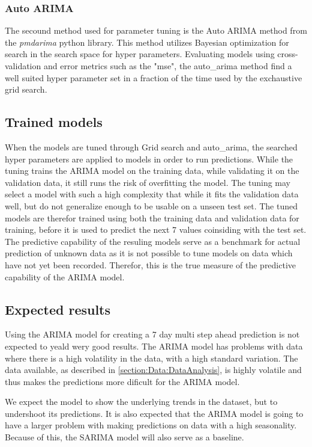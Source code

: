 \subsubsection{Auto ARIMA}
The secound method used for parameter tuning is the Auto ARIMA method from the \textit{pmdarima} python library.
This method utilizes Bayesian optimization for search in the search space for hyper parameters.
Evaluating models using cross-validation and error metrics such as the "mse",
the auto\_arima method find a well suited hyper parameter set in a fraction of the time used by the exchaustive grid search.

\subsection{Trained models}
When the models are tuned through Grid search and auto\_arima,
the searched hyper parameters are applied to models in order to run predictions.
While the tuning trains the ARIMA model on the training data, while validating it on the validation data,
it still runs the risk of overfitting the model.
The tuning may select a model with such a high complexity that while it fits the validation data well,
but do not generalize enough to be usable on a unseen test set.
The tuned models are therefor trained using both the training data and validation data for training,
before it is used to predict the next 7 values coinsiding with the test set.
The predictive capability of the resuling models serve as a benchmark for actual prediction
of unknown data as it is not possible to tune models on data which have not yet been recorded.
Therefor, this is the true measure of the predictive capability of the ARIMA model.


\subsection{Expected results}

Using the ARIMA model for creating a 7 day multi step ahead prediction is not expected to yeald wery good results.
The ARIMA model has problems with data where there is a high volatility in the data, with a high standard variation.
The data available, as described in \cref{section:Data:DataAnalysis},
is highly volatile and thus makes the predictions more dificult for the ARIMA model.

We expect the model to show the underlying trends in the dataset, but to
undershoot its predictions.
It is also expected that the ARIMA model is going to have a larger problem with making predictions on data with a high seasonality.
Because of this, the SARIMA model will also serve as a baseline.


